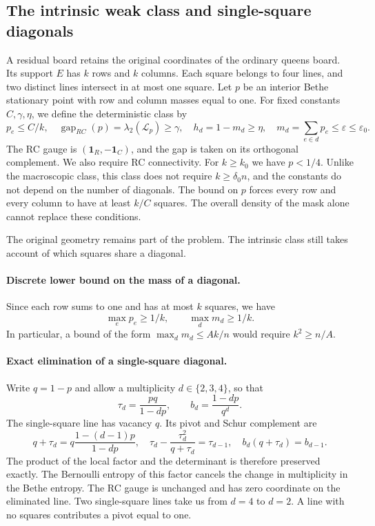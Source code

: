 \subsection{The intrinsic weak class and single-square diagonals}\label{sec:B5T01}
A residual board retains the original coordinates of the ordinary queens board.
Its support $E$ has $k$ rows and $k$ columns. Each square belongs to
four lines, and two distinct lines intersect in at most one square.
Let $p$ be an interior Bethe stationary point with row and column masses equal to one.
For fixed constants $C,\gamma,\eta$, we define the deterministic class by
\[
 p_e\le C/k,\quad \operatorname{gap}_{RC}(p)=\lambda_2(\mathscr L_p)\ge\gamma,
 \quad h_d=1-m_d\ge\eta,\quad
 m_d=\sum_{e\in d}p_e\le\varepsilon\le\varepsilon_0.
\]
The RC gauge is $(\mathbf1_R,-\mathbf1_C)$, and the gap is taken on its orthogonal complement. We also
require
RC connectivity. For $k\ge k_0$ we have $p<1/4$. Unlike the macroscopic class, this class does not
require $k\ge\delta_0n$, and the constants do not depend on the number of diagonals. The bound on $p$
forces every row and every column to have at least $k/C$ squares. The overall density of the mask
alone cannot replace these conditions.

The original geometry remains part of the problem. The intrinsic class still takes account
of which squares share a diagonal.

\paragraph{Discrete lower bound on the mass of a diagonal.}
Since each row sums to one and has at most $k$ squares, we have
\[
 \max_e p_e\ge1/k,\qquad \max_d m_d\ge1/k.
\]
In particular, a bound of the form $\max_dm_d\le Ak/n$ would require $k^2\ge n/A$.

\paragraph{Exact elimination of a single-square diagonal.}
Write $q=1-p$ and allow a multiplicity $d\in\{2,3,4\}$, so that
\[
 \tau_d=\frac{pq}{1-dp},\qquad b_d=\frac{1-dp}{q^d}.
\]
The single-square line has vacancy $q$. Its pivot and Schur complement are
\[
 q+\tau_d=q\frac{1-(d-1)p}{1-dp},\quad
 \tau_d-\frac{\tau_d^2}{q+\tau_d}=\tau_{d-1},\quad
 b_d(q+\tau_d)=b_{d-1}.
\]
The product of the local factor and the determinant is therefore preserved exactly.
The Bernoulli entropy of this factor cancels the change in multiplicity
in the Bethe entropy. The RC gauge is unchanged and has zero coordinate
on the eliminated line. Two single-square lines take us from $d=4$ to $d=2$.
A line with no squares contributes a pivot equal to one.

